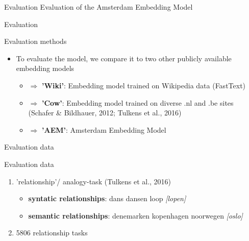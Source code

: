 \documentclass[compress]{beamer}
\begin{document}
\begin{frame}{Evaluation}
	Evaluation of the Amsterdam Embedding Model
\end{frame}

\begin{frame}{Evaluation}
	\begin{block}{Evaluation methods}
		\begin{itemize}
			\item To evaluate the model, we compare it to two other publicly available embedding models
			\begin{itemize}
				\item $\Rightarrow$ \textbf {'Wiki'}: Embedding model trained on Wikipedia data (FastText)
				\item $\Rightarrow$ \textbf{'Cow'}: Embedding model trained on diverse .nl and .be sites (Schafer \& Bildhauer, 2012; Tulkens et al., 2016)
				\item $\Rightarrow$ \textbf{'AEM'}: Amsterdam Embedding Model
			\end{itemize}
		\end{itemize}
	\end{block}
\end{frame}


\begin{frame}{Evaluation data}
	\begin{block}{Evaluation data}
		\begin{enumerate}
			\item 'relationship'/ analogy-task (Tulkens et al., 2016)
			\begin{itemize}
				\item \textbf{syntatic relationships}: dans dansen loop \textit{[lopen]}
				\item \textbf{semantic relationships}: denemarken kopenhagen noorwegen \textit{[oslo]}
			\end{itemize}
			\item 5806 relationship tasks
		\end{enumerate}
	\end{block}
\end{frame}
\end{document}
